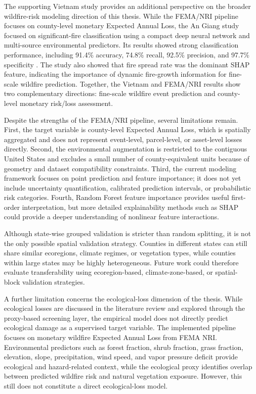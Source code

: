 The supporting Vietnam study provides an additional perspective on the broader wildfire-risk modeling direction of this thesis. While the FEMA/NRI pipeline focuses on county-level monetary Expected Annual Loss, the An Giang study focused on significant-fire classification using a compact deep neural network and multi-source environmental predictors. Its results showed strong classification performance, including 91.4\% accuracy, 74.8\% recall, 92.5\% precision, and 97.7\% specificity \citep{suliman2026angiang}. The study also showed that fire spread rate was the dominant SHAP feature, indicating the importance of dynamic fire-growth information for fine-scale wildfire prediction. Together, the Vietnam and FEMA/NRI results show two complementary directions: fine-scale wildfire event prediction and county-level monetary risk/loss assessment.

Despite the strengths of the FEMA/NRI pipeline, several limitations remain. First, the target variable is county-level Expected Annual Loss, which is spatially aggregated and does not represent event-level, parcel-level, or asset-level losses directly. Second, the environmental augmentation is restricted to the contiguous United States and excludes a small number of county-equivalent units because of geometry and dataset compatibility constraints. Third, the current modeling framework focuses on point prediction and feature importance; it does not yet include uncertainty quantification, calibrated prediction intervals, or probabilistic risk categories. Fourth, Random Forest feature importance provides useful first-order interpretation, but more detailed explainability methods such as SHAP could provide a deeper understanding of nonlinear feature interactions.

Although state-wise grouped validation is stricter than random splitting, it is not the only possible spatial validation strategy. Counties in different states can still share similar ecoregions, climate regimes, or vegetation types, while counties within large states may be highly heterogeneous. Future work could therefore evaluate transferability using ecoregion-based, climate-zone-based, or spatial-block validation strategies.

A further limitation concerns the ecological-loss dimension of the thesis. While ecological losses are discussed in the literature review and explored through the proxy-based screening layer, the empirical model does not directly predict ecological damage as a supervised target variable. The implemented pipeline focuses on monetary wildfire Expected Annual Loss from FEMA NRI. Environmental predictors such as forest fraction, shrub fraction, grass fraction, elevation, slope, precipitation, wind speed, and vapor pressure deficit provide ecological and hazard-related context, while the ecological proxy identifies overlap between predicted wildfire risk and natural vegetation exposure. However, this still does not constitute a direct ecological-loss model.

